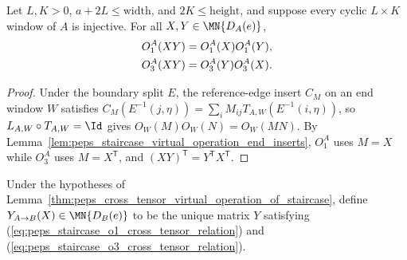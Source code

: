 \begin{lemma}%
    \label{thm:peps_staircase_end_physical_operation_multiplication}
    \leanok
    Let $L,K>0$, $a+2L\leq\mathrm{width}$, and $2K\leq\mathrm{height}$, and
    suppose every cyclic $L\times K$ window of $A$ is injective. For all
    $X,Y\in\MN{D_A(e)}$,
    \begin{align}
        O_1^A(XY) & =O_1^A(X)O_1^A(Y),
        \notag                         \\
        O_3^A(XY) & =O_3^A(Y)O_3^A(X).
        \notag
    \end{align}
\end{lemma}
\begin{proof}
    \leanok
    Under the boundary split $E$, the reference-edge insert $C_M$ on an end
    window $W$ satisfies
    $C_M(E^{-1}(j,\eta))=\sum_i M_{ij}T_{A,W}(E^{-1}(i,\eta))$, so
    $L_{A,W}\circ T_{A,W}=\Id$ gives $O_W(M)O_W(N)=O_W(MN)$. By
    Lemma~\ref{lem:peps_staircase_virtual_operation_end_inserts}, $O_1^A$ uses
    $M=X$ while $O_3^A$ uses $M=X^{\mathsf T}$, and
    $(XY)^{\mathsf T}=Y^{\mathsf T}X^{\mathsf T}$.
\end{proof}

\begin{definition}%
    \label{def:peps_staircase_cross_tensor_virtual_operation}
    \leanok
    Under the hypotheses of
    Lemma~\ref{thm:peps_cross_tensor_virtual_operation_of_staircase}, define
    $Y_{A\to B}(X)\in\MN{D_B(e)}$ to be the unique matrix $Y$ satisfying
    (\ref{eq:peps_staircase_o1_cross_tensor_relation}) and
    (\ref{eq:peps_staircase_o3_cross_tensor_relation}).
\end{definition}

